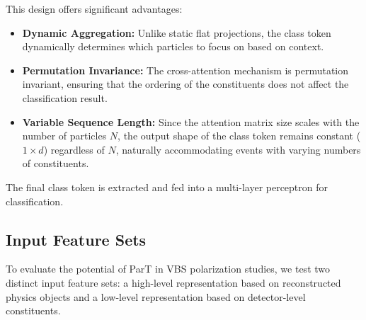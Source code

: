 \documentclass[12pt]{article}
\begin{document}
            This design offers significant advantages:
            \begin{itemize}
                \item \textbf{Dynamic Aggregation:} Unlike static flat projections, the class token dynamically determines which particles to focus on based on context.
                \item \textbf{Permutation Invariance:} The cross-attention mechanism is permutation invariant, ensuring that the ordering of the constituents does not affect the classification result.
                \item \textbf{Variable Sequence Length:} Since the attention matrix size scales with the number of particles $N$, the output shape of the class token remains constant ($1 \times d$) regardless of $N$, naturally accommodating events with varying numbers of constituents.
            \end{itemize}
            
            The final class token is extracted and fed into a multi-layer perceptron for classification.


    \subsection{Input Feature Sets}%
    \label{sub:part_input_features}

        To evaluate the potential of ParT in VBS polarization studies, we test two distinct input feature sets: a high-level representation based on reconstructed physics objects and a low-level representation based on detector-level constituents.
\end{document}
